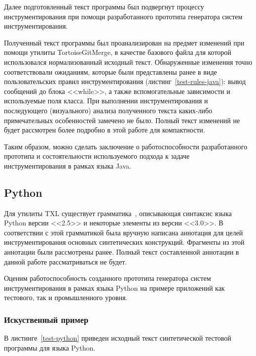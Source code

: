 Далее подготовленный текст программы был подвергнут процессу инструментирования при помощи разработанного прототипа генератора систем инструментирования.

Полученный текст программы был проанализирован на предмет изменений при помощи утилиты TortoiseGitMerge, в качестве базового файла для которой использовался нормализованный исходный текст.
Обнаруженные изменения точно соответствовали ожиданиям, которые были представлены ранее в виде пользовательских правил инструментирования (листинг~\ref{test-rules-java}): вывод сообщений до блока <<while>>, а также вспомогательные зависимости и используемые поля класса.
При выполнении инструментирования и последующего (визуального) анализа полученного текста каких-либо примечательных особенностей замечено не было.
Полный текст изменений не будет рассмотрен более подробно в этой работе для компактности.

Таким образом, можно сделать заключение о работоспособности разработанного прототипа и состоятельности используемого подхода к задаче инструментирования в рамках языка Java.

\subsection{Python}

Для утилиты TXL существует грамматика~\cite{txl-resources}, описывающая синтаксис языка Python версии <<2.5>> и некоторые элементы из версии <<3.0>>.
В соответствии с этой грамматикой была вручную написана аннотация для целей инструментирования основных синтетических конструкций.
Фрагменты из этой аннотации были рассмотрены ранее.
Полный текст составленной аннотации в данной работе рассматриваться не будет.

Оценим работоспособность созданного прототипа генератора систем инструментирования в рамках языка Python на примере приложений как тестового, так и промышленного уровня.

\subsubsection{Искуственный пример}

В листинге~\ref{test-python} приведен исходный текст синтетической тестовой программы для языка Python.

